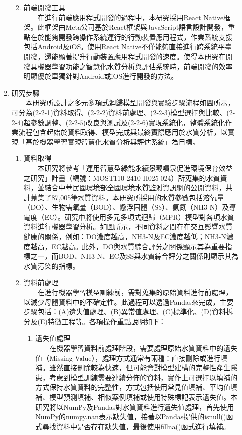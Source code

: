 \documentclass[12pt,a4paper]{article}
\begin{document}
\begin{enumerate}
\begin{enumerate}[label=\arabic*.]
\begin{enumerate}[label=2-1-\arabic*.]
\begin{enumerate}[label=\Alph*.]
            \end{enumerate}
        \item 前端開發工具\\
        　　在進行前端應用程式開發的過程中，本研究採用React Native框架。此框架由Meta公司基於React框架與JavaScript語言設計開發，重點在於能夠開發跨操作系統運行的行動裝置應用程式，作業系統支援包括Android及iOS\cite{ref23}。使用React Native不僅能夠直接進行跨系統平臺開發，還能顯著提升行動裝置應用程式開發的速度。使得本研究在開發具機器學習功能之智慧化水質分析與評估系統時，前端開發的效率明顯優於單獨針對Android或iOS進行開發的方法。
    \end{enumerate}
\item 研究步驟\\
　　本研究所設計之多元多項式迴歸模型開發與實驗步驟流程如圖所示，可分為(2-2-1)資料取得、(2-2-2)資料前處理、(2-2-3)模型選擇與比較、(2-2-4)超參數調整、(2-2-5)改良與測試及(2-2-6)實現系統化，整體系統化作業流程包含起始於資料取得、模型完成與最終實際應用於水質分析，以實現「基於機器學習實現智慧化水質分析與評估系統」為目標。
    \begin{enumerate}[label=2-2-\arabic*.]
        \item 資料取得\\
        　　本研究將參考「運用智慧型綠能永續景觀噴泉促進環境保育效益之研究」計畫（編號：MOST110-2410-H025-024）所蒐集的水質資料，並結合中華民國環境部全國環境水質監測資訊網的公開資料，共計蒐集了87,005筆水質資料。本研究所採用的水質參數包括溶氧量（DO）、生物需氧量（BOD）、懸浮固體（SS）、氨氮（NH3-N）及導電度（EC）。研究中將使用多元多項式迴歸（MPR）模型對各項水質資料進行機器學習分析。如圖所示，不同資料之間存在交互影響水質健康的關係，例如：DO濃度越高，NH3-N及EC濃度越低；NH3-N濃度越高，EC越高。此外，DO與水質綜合評分之關係顯示其為重要指標之一，而BOD、NH3-N、EC及SS與水質綜合評分之關係則顯示其為水質污染的指標。        
        \item 資料前處理\\
        　　在進行機器學習模型訓練前，需對蒐集的原始資料進行前處理，以減少母體資料中的不確定性。此過程可以透過Pandas來完成，主要步驟包括：(A)遺失值處理、(B)異常值處理、(C)標準化、(D)資料拆分及(E)特徵工程等。各項操作重點說明如下：
            \begin{enumerate}[label=\Alph*.]
                \item 遺失值處理\\
                　　在機器學習資料前處理階段，需要處理原始水質資料中的遺失值（Missing Value），處理方式通常有兩種：直接刪除或進行填補。雖然直接刪除較為快速，但可能會對模型建構的完整性產生隱患，考慮到模型訓練需要連續分佈的資料，實作上可選擇以填補的方式保持水質資料的完整性，方式包括使用常見值填補、平均值填補、模型預測填補、相似案例填補或使用特殊標記表示遺失值\cite{ref24}。本研究將以NumPy及Pandas對水質資料進行遺失值處理，首先使用NumPy的numpy.nan表示缺失值，接著以Pandas提供的isnull()函式尋找資料中是否存在缺失值，最後使用fillna()函式進行填補。

\end{enumerate}
\end{enumerate}
\end{enumerate}
\end{enumerate}
\end{document}
